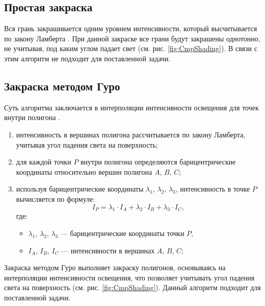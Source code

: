 \subsection{Простая закраска}

Вся грань закрашивается одним уровнем интенсивности, который высчитывается по закону Ламберта \cite{Rodgers}. При данной закраске все грани будут закрашены однотонно, не учитывая, под каким углом падает свет (см. рис. \ref{fig:CmpShading}). В связи с этим алгоритм не подходит для поставленной задачи.

\subsection{Закраска методом Гуро}  

Суть алгоритма заключается в интерполяции интенсивности освещения для точек внутри полигона \cite{Rodgers}.  

\begin{enumerate}  
    \item интенсивность в вершинах полигона рассчитывается по закону Ламберта, учитывая угол падения света на поверхность;
    \item для каждой точки \( P \) внутри полигона определяются барицентрические координаты относительно вершин полигона \( A \), \( B \), \( C \);
    \item используя барицентрические координаты \( \lambda_1 \), \( \lambda_2 \), \( \lambda_3 \), интенсивность в точке \( P \) вычисляется по формуле:  
    \begin{equation}
        \label{eq:int_barycentric}
        I_P = \lambda_1 \cdot I_A + \lambda_2 \cdot I_B + \lambda_3 \cdot I_C,
    \end{equation}  
    где:  
    \begin{itemize}
        \item \( \lambda_1 \), \( \lambda_2 \), \( \lambda_3 \) — барицентрические координаты точки \( P \),  
        \item \( I_A \), \( I_B \), \( I_C \) — интенсивности в вершинах \( A \), \( B \), \( C \);  
    \end{itemize}
\end{enumerate}  

Закраска методом Гуро выполняет закраску полигонов, основываясь на интерполяции интенсивности освещения, что позволяет учитывать угол падения света на поверхность (см. рис. \ref{fig:CmpShading}). Данный алгоритм подходит для поставленной задачи.


